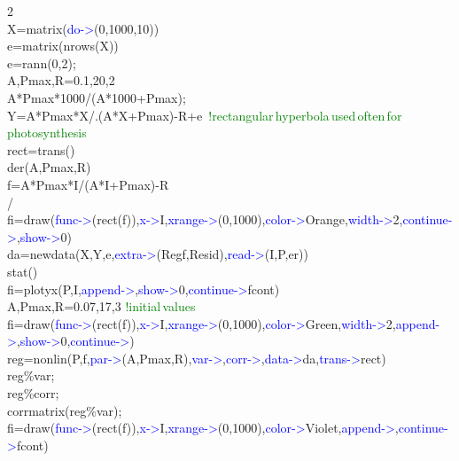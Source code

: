 \begin{itemize}
\begin{example}[derex2]2\\
\label{derex2}
X=\textcolor{VioletRed}{matrix}(\textcolor{blue}{do->}(0,1000,10))\\
e=\textcolor{VioletRed}{matrix}(\textcolor{VioletRed}{nrows}(X))\\
e=\textcolor{VioletRed}{rann}(0,2);\\
A,Pmax,R=0.1,20,2\\
A*Pmax*1000/(A*1000+Pmax);\\
Y=A*Pmax*X/.(A*X+Pmax)-R+e \,\textcolor{green}{!rectangular\,hyperbola\,used\,often\,for\,photosynthesis}
\\
rect=\textcolor{VioletRed}{trans}()\\
\textcolor{VioletRed}{der}(A,Pmax,R)\\
f=A*Pmax*I/(A*I+Pmax)-R\\
/
\\
fi=\textcolor{VioletRed}{draw}(\textcolor{blue}{func->}(rect(f)),\textcolor{blue}{x->}I,\textcolor{blue}{xrange->}(0,1000),\textcolor{blue}{color->}Orange,\textcolor{blue}{width->}2,\textcolor{blue}{continue->},\textcolor{blue}{show->}0)\\
da=\textcolor{VioletRed}{newdata}(X,Y,e,\textcolor{blue}{extra->}(Regf,Resid),\textcolor{blue}{read->}(I,P,er))\\
\textcolor{VioletRed}{stat}()\\
fi=\textcolor{VioletRed}{plotyx}(P,I,\textcolor{blue}{append->},\textcolor{blue}{show->}0,\textcolor{blue}{continue->}fcont)
\\
A,Pmax,R=0.07,17,3 \textcolor{green}{!initial\,values}
\\
fi=\textcolor{VioletRed}{draw}(\textcolor{blue}{func->}(rect(f)),\textcolor{blue}{x->}I,\textcolor{blue}{xrange->}(0,1000),\textcolor{blue}{color->}Green,\textcolor{blue}{width->}2,\textcolor{blue}{append->},\textcolor{blue}{show->}0,\textcolor{blue}{continue->})\\
reg=\textcolor{VioletRed}{nonlin}(P,f,\textcolor{blue}{par->}(A,Pmax,R),\textcolor{blue}{var->},\textcolor{blue}{corr->},\textcolor{blue}{data->}da,\textcolor{blue}{trans->}rect)\\
reg\%var;\\
reg\%corr;\\
\textcolor{VioletRed}{corrmatrix}(reg\%var);\\
fi=\textcolor{VioletRed}{draw}(\textcolor{blue}{func->}(rect(f)),\textcolor{blue}{x->}I,\textcolor{blue}{xrange->}(0,1000),\textcolor{blue}{color->}Violet,\textcolor{blue}{append->},\textcolor{blue}{continue->}fcont)
\end{example}

\end{itemize}
